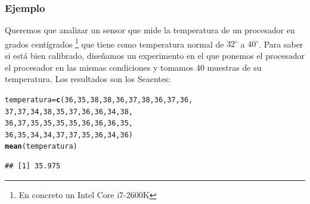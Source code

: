 \documentclass[12pt,t]{beamer}\usepackage[]{graphicx}\usepackage[]{color}
\makeatletter
\newcommand{\hlnum}[1]{\textcolor[rgb]{0.686,0.059,0.569}{#1}}%
\newcommand{\hlstd}[1]{\textcolor[rgb]{0.345,0.345,0.345}{#1}}%
\newcommand{\hlkwb}[1]{\textcolor[rgb]{0.69,0.353,0.396}{#1}}%
\newcommand{\hlkwd}[1]{\textcolor[rgb]{0.737,0.353,0.396}{\textbf{#1}}}%
\newenvironment{kframe}{%
 \def\at@end@of@kframe{}%
 \ifinner\ifhmode%
  \def\at@end@of@kframe{\end{minipage}}%
  \begin{minipage}{\columnwidth}%
 \fi\fi%
 \def\FrameCommand##1{\hskip\@totalleftmargin \hskip-\fboxsep
 \colorbox{shadecolor}{##1}\hskip-\fboxsep
     \hskip-\linewidth \hskip-\@totalleftmargin \hskip\columnwidth}%
 \MakeFramed {\advance\hsize-\width
   \@totalleftmargin\z@ \linewidth\hsize
   \@setminipage}}%
 {\par\unskip\endMakeFramed%
 \at@end@of@kframe}
\newenvironment{knitrout}{}{} %
\renewcommand{\emph}[1]{{\color{red}#1}}
\theoremstyle{plain}
\theoremstyle{definition}
\makeatother
\begin{document}
\begin{frame}[fragile]
\frametitle{Ejemplo}
Queremos que analizar un sensor que mide la temperatura de un procesador en grados centígrados \footnote{En concreto un \emph{Intel Core i7-2600K}} que tiene 	como temperatura normal de  $32^{\circ}$ a $40^{\circ}$. Para saber si está bien calibrado, diseñamos un experimento en el que ponemos  el procesador el procesador en las mismas condiciones y  tomamos 40 muestras de su temperatura.
Los resultados son los Seaentes:

\begin{knitrout}\small
{}\color{fgcolor}\begin{kframe}
\begin{alltt}
\hlstd{temperatura}\hlkwb{=}\hlkwd{c}\hlstd{(}\hlnum{36}\hlstd{,}\hlnum{35}\hlstd{,}\hlnum{38}\hlstd{,}\hlnum{38}\hlstd{,}\hlnum{36}\hlstd{,}\hlnum{37}\hlstd{,}\hlnum{38}\hlstd{,}\hlnum{36}\hlstd{,}\hlnum{37}\hlstd{,}\hlnum{36}\hlstd{,}
              \hlnum{37}\hlstd{,}\hlnum{37}\hlstd{,}\hlnum{34}\hlstd{,}\hlnum{38}\hlstd{,}\hlnum{35}\hlstd{,}\hlnum{37}\hlstd{,}\hlnum{36}\hlstd{,}\hlnum{36}\hlstd{,}\hlnum{34}\hlstd{,}\hlnum{38}\hlstd{,}
              \hlnum{36}\hlstd{,}\hlnum{37}\hlstd{,}\hlnum{35}\hlstd{,}\hlnum{35}\hlstd{,}\hlnum{35}\hlstd{,}\hlnum{35}\hlstd{,}\hlnum{36}\hlstd{,}\hlnum{36}\hlstd{,}\hlnum{36}\hlstd{,}\hlnum{35}\hlstd{,}
              \hlnum{36}\hlstd{,}\hlnum{35}\hlstd{,}\hlnum{34}\hlstd{,}\hlnum{34}\hlstd{,}\hlnum{37}\hlstd{,}\hlnum{37}\hlstd{,}\hlnum{35}\hlstd{,}\hlnum{36}\hlstd{,}\hlnum{34}\hlstd{,}\hlnum{36}\hlstd{)}
\hlkwd{mean}\hlstd{(temperatura)}
\end{alltt}
\begin{verbatim}
## [1] 35.975
\end{verbatim}
\end{kframe}
\end{knitrout}

\end{frame}
\end{document}
